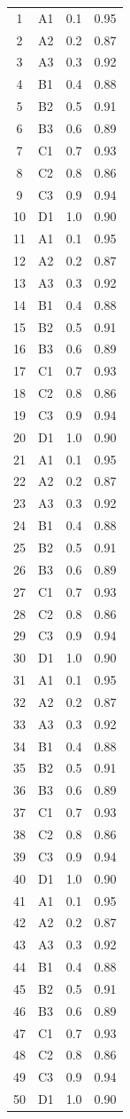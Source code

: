 \begin{longtable}{|c|l|c|c|}
1 & A1 & 0.1 & 0.95 \\
2 & A2 & 0.2 & 0.87 \\
3 & A3 & 0.3 & 0.92 \\
4 & B1 & 0.4 & 0.88 \\
5 & B2 & 0.5 & 0.91 \\
6 & B3 & 0.6 & 0.89 \\
7 & C1 & 0.7 & 0.93 \\
8 & C2 & 0.8 & 0.86 \\
9 & C3 & 0.9 & 0.94 \\
10 & D1 & 1.0 & 0.90 \\
11 & A1 & 0.1 & 0.95 \\
12 & A2 & 0.2 & 0.87 \\
13 & A3 & 0.3 & 0.92 \\
14 & B1 & 0.4 & 0.88 \\
15 & B2 & 0.5 & 0.91 \\
16 & B3 & 0.6 & 0.89 \\
17 & C1 & 0.7 & 0.93 \\
18 & C2 & 0.8 & 0.86 \\
19 & C3 & 0.9 & 0.94 \\
20 & D1 & 1.0 & 0.90 \\
21 & A1 & 0.1 & 0.95 \\
22 & A2 & 0.2 & 0.87 \\
23 & A3 & 0.3 & 0.92 \\
24 & B1 & 0.4 & 0.88 \\
25 & B2 & 0.5 & 0.91 \\
26 & B3 & 0.6 & 0.89 \\
27 & C1 & 0.7 & 0.93 \\
28 & C2 & 0.8 & 0.86 \\
29 & C3 & 0.9 & 0.94 \\
30 & D1 & 1.0 & 0.90 \\
31 & A1 & 0.1 & 0.95 \\
32 & A2 & 0.2 & 0.87 \\
33 & A3 & 0.3 & 0.92 \\
34 & B1 & 0.4 & 0.88 \\
35 & B2 & 0.5 & 0.91 \\
36 & B3 & 0.6 & 0.89 \\
37 & C1 & 0.7 & 0.93 \\
38 & C2 & 0.8 & 0.86 \\
39 & C3 & 0.9 & 0.94 \\
40 & D1 & 1.0 & 0.90 \\
41 & A1 & 0.1 & 0.95 \\
42 & A2 & 0.2 & 0.87 \\
43 & A3 & 0.3 & 0.92 \\
44 & B1 & 0.4 & 0.88 \\
45 & B2 & 0.5 & 0.91 \\
46 & B3 & 0.6 & 0.89 \\
47 & C1 & 0.7 & 0.93 \\
48 & C2 & 0.8 & 0.86 \\
49 & C3 & 0.9 & 0.94 \\
50 & D1 & 1.0 & 0.90 \\
\end{longtable}

